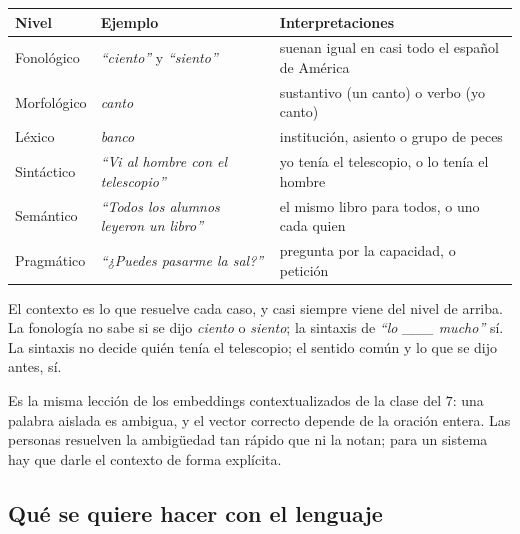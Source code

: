 \documentclass[11pt,letterpaper]{article}
\begin{document}
\begin{center}
\small
\begin{tabular}{l>{\raggedright\arraybackslash}p{5.2cm}%
                 >{\raggedright\arraybackslash}p{5.6cm}}
    \toprule
    \textbf{Nivel} & \textbf{Ejemplo} & \textbf{Interpretaciones} \\
    \midrule
    Fonológico & \textit{``ciento''} y \textit{``siento''}
               & suenan igual en casi todo el español de América \\
    \addlinespace
    Morfológico & \textit{canto}
                & sustantivo (un canto) o verbo (yo canto) \\
    \addlinespace
    Léxico & \textit{banco}
           & institución, asiento o grupo de peces \\
    \addlinespace
    Sintáctico & \textit{``Vi al hombre con el telescopio''}
               & yo tenía el telescopio, o lo tenía el hombre \\
    \addlinespace
    Semántico & \textit{``Todos los alumnos leyeron un libro''}
              & el mismo libro para todos, o uno cada quien \\
    \addlinespace
    Pragmático & \textit{``¿Puedes pasarme la sal?''}
               & pregunta por la capacidad, o petición \\
    \bottomrule
\end{tabular}
\end{center}

El contexto es lo que resuelve cada caso, y casi siempre viene del
nivel de arriba. La fonología no sabe si se dijo \textit{ciento} o
\textit{siento}; la sintaxis de \textit{``lo \_\_\_ mucho''} sí. La
sintaxis no decide quién tenía el telescopio; el sentido común y lo
que se dijo antes, sí.

\begin{idea}
    Es la misma lección de los embeddings contextualizados de la clase
    del $7$: una palabra aislada es ambigua, y el vector correcto
    depende de la oración entera. Las personas resuelven la ambigüedad
    tan rápido que ni la notan; para un sistema hay que darle el
    contexto de forma explícita.
\end{idea}


\subsection*{Qué se quiere hacer con el lenguaje}
\end{document}
